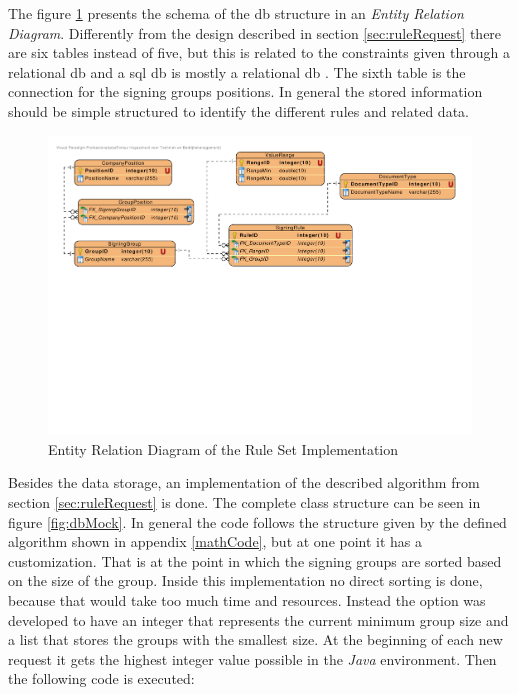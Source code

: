 The figure \ref{fig:db} presents the schema of the \gls{db} structure in an \textit{Entity Relation Diagram}. Differently from the design described in section \ref{sec:ruleRequest} there are six tables instead of five, but this is related to the constraints given through a relational \gls{db} and a \gls{sql} \gls{db} is mostly a relational \gls{db} \parencite{rdbsql2018}. The sixth table is the connection for the signing groups positions. In general the stored information should be simple structured to identify the different rules and related data.

\begin{figure}[h!]
	\includegraphics[width=\linewidth]{./implementation/images/db.pdf}
	\centering
	\caption{Entity Relation Diagram of the Rule Set Implementation}
	\label{fig:db}
\end{figure}

Besides the data storage, an implementation of the described algorithm from section \ref{sec:ruleRequest} is done. The complete class structure can be seen in figure \ref{fig:dbMock}. In general the code follows the structure given by the defined algorithm shown in appendix \ref{mathCode}, but at one point it has a customization. That is at the point in which the signing groups are sorted based on the size of the group. \newline
Inside this implementation no direct sorting is done, because that would take too much time and resources. Instead the option was developed to have an integer that represents the current minimum group size and a list that stores the groups with the smallest size. At the beginning of each new request it gets the highest integer value possible in the \textit{Java} environment. Then the following code is executed:

